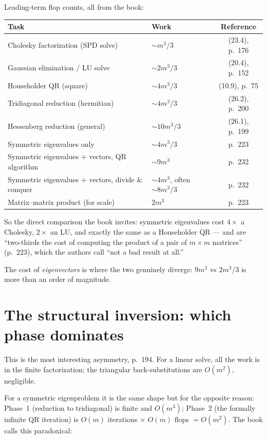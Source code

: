 \documentclass[11pt,a4paper]{article}
\begin{document}
Leading-term flop counts, all from the book:

\begin{center}
\begin{tabular}{@{}llc@{}}
\toprule
\textbf{Task} & \textbf{Work} & \textbf{Reference} \\
\midrule
Cholesky factorization (SPD solve)   & $\sim m^3/3$    & (23.4), p.~176 \\
Gaussian elimination / LU solve      & $\sim 2m^3/3$   & (20.4), p.~152 \\
Householder QR (square)              & $\sim 4m^3/3$   & (10.9), p.~75  \\
Tridiagonal reduction (hermitian)    & $\sim 4m^3/3$   & (26.2), p.~200 \\
Hessenberg reduction (general)       & $\sim 10m^3/3$  & (26.1), p.~199 \\
Symmetric eigenvalues only           & $\sim 4m^3/3$   & p.~223 \\
Symmetric eigenvalues $+$ vectors, QR algorithm
                                     & $\sim 9m^3$     & p.~232 \\
Symmetric eigenvalues $+$ vectors, divide \& conquer
                                     & $\sim 4m^3$, often $\sim 8m^3/3$ & p.~232 \\
Matrix--matrix product (for scale)   & $2m^3$          & p.~223 \\
\bottomrule
\end{tabular}
\end{center}

So the direct comparison the book invites: symmetric eigenvalues cost
$4\times$ a Cholesky, $2\times$ an LU, and exactly the same as a Householder
QR --- and are ``two-thirds the cost of computing the product of a pair of
$m \times m$ matrices'' (p.~223), which the authors call ``not a bad result at
all.''

The cost of \emph{eigenvectors} is where the two genuinely diverge: $9m^3$ vs
$2m^3/3$ is more than an order of magnitude.

\section{The structural inversion: which phase dominates}

This is the most interesting asymmetry, p.~194. For a linear solve, all the work
is in the finite factorization; the triangular back-substitutions are $O(m^2)$,
negligible.

For a symmetric eigenproblem it is the same shape but for the opposite reason:
Phase~1 (reduction to tridiagonal) is finite and $O(m^3)$; Phase~2 (the formally
infinite QR iteration) is $O(m)$ iterations $\times$ $O(m)$ flops $= O(m^2)$.
The book calls this paradoxical:
\end{document}
